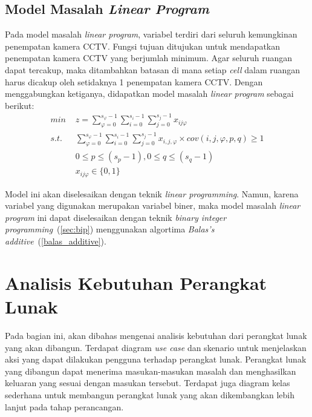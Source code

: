 \subsection{Model Masalah \textit{Linear Program}}
Pada model masalah \textit{linear program}, variabel terdiri dari seluruh kemungkinan penempatan kamera CCTV. Fungsi tujuan ditujukan untuk mendapatkan penempatan kamera CCTV yang berjumlah minimum. Agar seluruh ruangan dapat tercakup, maka ditambahkan batasan di mana setiap \textit{cell} dalam ruangan harus dicakup oleh setidaknya 1 penempatan kamera CCTV. Dengan menggabungkan ketiganya, didapatkan model masalah \textit{linear program} sebagai berikut:
\begin{equation}
	\begin{split}
		\textit{min } & z = \sum_{\varphi=0}^{s_{\varphi}-1} \sum_{i=0}^{s_i-1} \sum_{j=0}^{s_j-1} x_{ij\varphi}\\
		\textit{s.t. } & \sum_{\varphi=0}^{s_{\varphi}-1} \sum_{i=0}^{s_i-1} \sum_{j=0}^{s_j-1} x_{i,j,\varphi} \times cov(i,j,\varphi,p,q) \geq 1\\
		& 0 \leq p \leq (s_p - 1), 0 \leq q \leq (s_q - 1)\\
		& x_{ij\varphi} \in \{0,1\}
	\end{split}
\end{equation}

Model ini akan diselesaikan dengan teknik \textit{linear programming}. Namun, karena variabel yang digunakan merupakan variabel biner, maka model masalah \textit{linear program} ini dapat diselesaikan dengan teknik \textit{binary integer programming}~(\ref{sec:bip}) menggunakan algortima \textit{Balas's additive}~(\ref{balas_additive}).


\section{Analisis Kebutuhan Perangkat Lunak}
Pada bagian ini, akan dibahas mengenai analisis kebutuhan dari perangkat lunak yang akan dibangun. Terdapat diagram \textit{use case} dan skenario untuk menjelaskan aksi yang dapat dilakukan pengguna terhadap perangkat lunak. Perangkat lunak yang dibangun dapat menerima masukan-masukan masalah dan menghasilkan keluaran yang sesuai dengan masukan tersebut. Terdapat juga diagram kelas sederhana untuk membangun perangkat lunak yang akan dikembangkan lebih lanjut pada tahap perancangan.

